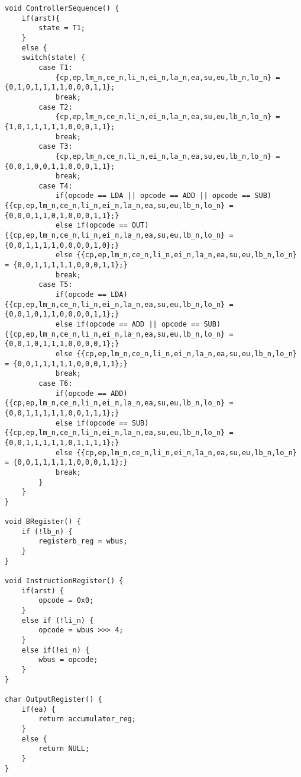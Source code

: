 \begin{lstlisting}[caption={SAP-1 architecture implemented in C},label=lst:sap1archc]
void ControllerSequence() {
	if(arst){
		state = T1;
	}
	else {
	switch(state) {
		case T1:
			{cp,ep,lm_n,ce_n,li_n,ei_n,la_n,ea,su,eu,lb_n,lo_n} = {0,1,0,1,1,1,1,0,0,0,1,1};
			break;
		case T2:
			{cp,ep,lm_n,ce_n,li_n,ei_n,la_n,ea,su,eu,lb_n,lo_n} = {1,0,1,1,1,1,1,0,0,0,1,1};
			break;
		case T3:
			{cp,ep,lm_n,ce_n,li_n,ei_n,la_n,ea,su,eu,lb_n,lo_n} = {0,0,1,0,0,1,1,0,0,0,1,1};
			break;
		case T4:
			if(opcode == LDA || opcode == ADD || opcode == SUB) {{cp,ep,lm_n,ce_n,li_n,ei_n,la_n,ea,su,eu,lb_n,lo_n} = {0,0,0,1,1,0,1,0,0,0,1,1};}
			else if(opcode == OUT) {{cp,ep,lm_n,ce_n,li_n,ei_n,la_n,ea,su,eu,lb_n,lo_n} = {0,0,1,1,1,1,0,0,0,0,1,0};}
			else {{cp,ep,lm_n,ce_n,li_n,ei_n,la_n,ea,su,eu,lb_n,lo_n} = {0,0,1,1,1,1,1,0,0,0,1,1};}
			break;
		case T5:
			if(opcode == LDA) {{cp,ep,lm_n,ce_n,li_n,ei_n,la_n,ea,su,eu,lb_n,lo_n} = {0,0,1,0,1,1,0,0,0,0,1,1};}
			else if(opcode == ADD || opcode == SUB) {{cp,ep,lm_n,ce_n,li_n,ei_n,la_n,ea,su,eu,lb_n,lo_n} = {0,0,1,0,1,1,1,0,0,0,0,1};}
			else {{cp,ep,lm_n,ce_n,li_n,ei_n,la_n,ea,su,eu,lb_n,lo_n} = {0,0,1,1,1,1,1,0,0,0,1,1};}
			break;
		case T6:
			if(opcode == ADD) {{cp,ep,lm_n,ce_n,li_n,ei_n,la_n,ea,su,eu,lb_n,lo_n} = {0,0,1,1,1,1,1,0,0,1,1,1};}
			else if(opcode == SUB) {{cp,ep,lm_n,ce_n,li_n,ei_n,la_n,ea,su,eu,lb_n,lo_n} = {0,0,1,1,1,1,1,0,1,1,1,1};}
			else {{cp,ep,lm_n,ce_n,li_n,ei_n,la_n,ea,su,eu,lb_n,lo_n} = {0,0,1,1,1,1,1,0,0,0,1,1};}
			break;
		}
	}
}

void BRegister() {
	if (!lb_n) {
		registerb_reg = wbus;
	}
}

void InstructionRegister() {
	if(arst) {
		opcode = 0x0;
	}
	else if (!li_n) {
		opcode = wbus >>> 4;
	}
	else if(!ei_n) {
		wbus = opcode;
	}
}

char OutputRegister() {
	if(ea) {
		return accumulator_reg;
	}
	else {
		return NULL;
	}
}
\end{lstlisting}
\clearpage
